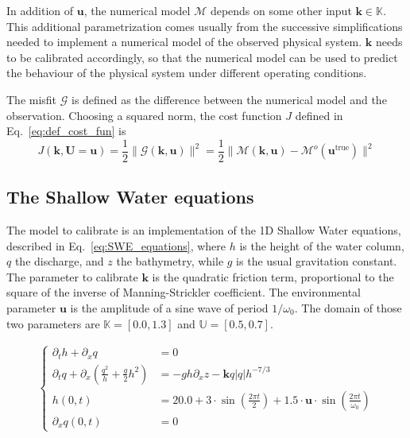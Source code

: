 \documentclass[preprint, review, 1p]{elsarticle}
\newcommand{\Kspace}{\mathbb{K}}
\newcommand{\Uspace}{\mathbb{U}}
\begin{document}
 
In addition of $\mathbf{u}$, the numerical model $\mathcal{M}$ depends on some other input $\mathbf{k}\in\Kspace$. This additional parametrization comes usually from the successive simplifications needed to implement a numerical model of the observed physical system. $\mathbf{k}$ needs to be calibrated accordingly, so that the numerical model can be used to predict the behaviour of the physical system under different operating conditions.

The misfit $\mathcal{G}$ is defined as the difference between the numerical model and the observation. Choosing a squared norm, the cost function $J$ defined in Eq.~\eqref{eq:def_cost_fun} is
\begin{equation}
J(\mathbf{k},\mathbf{U}=\mathbf{u}) = \frac12 \| \mathcal{G}(\mathbf{k},\mathbf{u}) \|^2 = \frac12 \|\mathcal{M}(\mathbf{k},\mathbf{u}) - \mathcal{M}^{o}(\mathbf{u}^{\mathrm{true}}) \|^2
\end{equation}
\subsection{The Shallow Water equations}

The model to calibrate is an implementation of the 1D Shallow Water equations, described in Eq.~\eqref{eq:SWE_equations}, where $h$ is the height of the water column, $q$ the discharge, and $z$ the bathymetry, while $g$ is the usual gravitation constant. The parameter to calibrate $\mathbf{k}$ is the quadratic friction term, proportional to the square of the inverse of Manning-Strickler coefficient. The environmental parameter $\mathbf{u}$ is the amplitude of a sine wave of period $1/\omega_0$. The domain of those two parameters are $\Kspace = [0.0, 1.3]$ and $\Uspace = [0.5, 0.7]$.


\begin{align}
  \label{eq:SWE_equations}
  \left\{
    \begin{array}{rl}
      \partial_t h + \partial_x q &= 0 \\
      \partial_t q + \partial_x \left(\frac{q^2}{h} + \frac{g}{2}h^2\right) &= - gh\partial_x z - \mathbf{k}q |q|h^{-7/3} \\
      h(0, t) &= 20.0 + 3\cdot \sin \left(\frac{2\pi t}{2}\right) + 1.5\cdot \mathbf{u} \cdot \sin\left(\frac{2 \pi t}{\omega_0}\right)\\
      \partial_x q(0, t) &= 0
      \end{array}
  \right.
\end{align}
\end{document}
